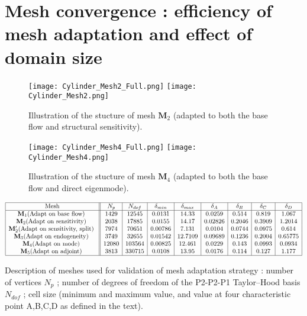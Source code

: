 \documentclass[twocolumn,10pt]{asme2ej}
\begin{document}
\section{Mesh convergence : efficiency of mesh adaptation and effect of domain size}
\begin{figure}
\texttt{[image: Cylinder\_Mesh2\_Full.png]}
\texttt{[image: Cylinder\_Mesh2.png]}
\caption{Illustration of the stucture of mesh  $\mathbf{M}_2$ (adapted to both the base flow and structural sensitivity).}
\label{fig:mesh2}
\end{figure}

\begin{figure}
\texttt{[image: Cylinder\_Mesh4\_Full.png]}
\texttt{[image: Cylinder\_Mesh4.png]}
\caption{Illustration of the stucture of mesh  $\mathbf{M}_4$ (adapted to both the base flow and direct eigenmode).}
\label{fig:mesh4}
\end{figure}



\begin{table*}
$$
\begin{array}{|c||c|c|c|c|c|c|c|c|c|}
\hline
\mbox{Mesh} & N_p & N_{dof} & \delta_{min} & \delta_{max} & \delta_A  & \delta_B  & \delta_C  & \delta_D  \\
\hline
\mathbf{M}_1 \mbox{(Adapt on base flow) } & 1429 & 12545	& 0.0131 & 14.33 		& 0.0259 	& 0.514 	& 0.819 	& 1.067 \\   
\mathbf{M}_2 \mbox{(Adapt on sensitivity) } & 2038 & 17885	& 0.0155 & 14.17 		& 0.02826 & 0.2046 	& 0.3909 	& 1.2014 	\\
\mathbf{M}_2' \mbox{(Adapt on sensitivity, split) } & 7974 & 70651	& 0.00786 & 7.131  		& 0.0104 	& 0.0744 	&   0.0975 & 0.614   \\
\mathbf{M}_3 \mbox{(Adapt on endogeneity) } & 3749 & 32655	& 0.01542 & 12.7109  		& 0.09689 	& 0.1236 	&   0.2004 & 0.65775   \\
\mathbf{M}_4 \mbox{(Adapt on mode) } 	& 12080  & 103564		&0.00825	& 12.461		& 0.0229	& 0.143	& 0.0993	& 0.0934 \\
\mathbf{M}_5 \mbox{(Adapt on adjoint) } 	& 3813 	& 330715		& 0.0108	& 13.95		& 0.0176 	& 0.114	& 0.127	& 1.177  \\
\hline
\end{array}
$$
\caption{Description of meshes used for validation of mesh adaptation strategy : number of vertices $N_p$ ; number of degrees of freedom of the P2-P2-P1 Taylor--Hood basis $N_{dof}$ ; cell size (minimum and maximum value, and value at four characteristic point A,B,C,D as defined in the text). 
 }
\label{tab:conv1}
\end{table*}
\end{document}
